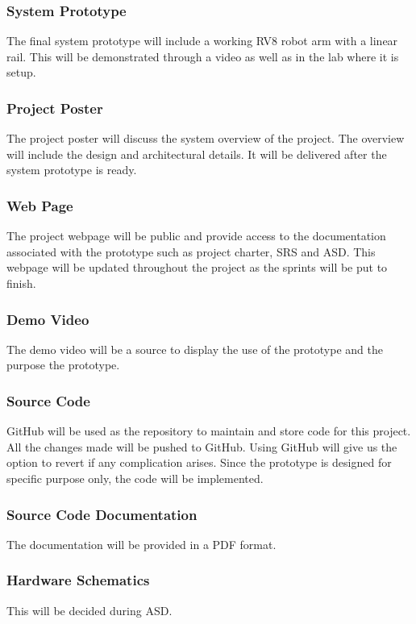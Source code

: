 \subsubsection{System Prototype}
The final system prototype will include a working RV8 robot arm with a linear rail. This will be demonstrated through a video as well as in the lab where it is setup. 

\subsubsection{Project Poster}
The project poster will discuss the system overview of the project. The overview will include the design and architectural details. It will be delivered after the system prototype is ready. 

\subsubsection{Web Page}
The project webpage will be public and provide access to the documentation associated with the prototype such as project charter, SRS and ASD. This webpage will be updated throughout the project as the sprints will be put to finish. 

\subsubsection{Demo Video}
The demo video will be a source to display the use of the prototype and the purpose the prototype. 

\subsubsection{Source Code}
GitHub will be used as the repository to maintain and store code for this project. All the changes made will be pushed to GitHub. Using GitHub will give us the option to revert if any complication arises. Since the prototype is designed for specific purpose only, the code will be implemented. 

\subsubsection{Source Code Documentation}
The documentation will be provided in a PDF format. 

\subsubsection{Hardware Schematics}
This will be decided during ASD. 

